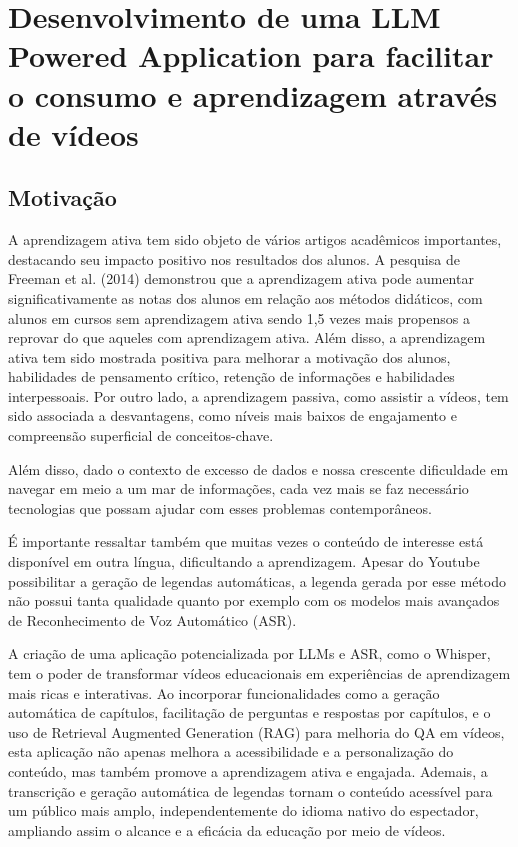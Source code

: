 \documentclass[tcc,capa]{texufpel}
\begin{document}
\chapter{Desenvolvimento de uma LLM Powered Application para facilitar o consumo e aprendizagem através de vídeos}

\section{Motivação}

A aprendizagem ativa tem sido objeto de vários artigos acadêmicos importantes, destacando seu impacto positivo nos resultados dos alunos. A pesquisa de Freeman et al. (2014) demonstrou que a aprendizagem ativa pode aumentar significativamente as notas dos alunos em relação aos métodos didáticos, com alunos em cursos sem aprendizagem ativa sendo 1,5 vezes mais propensos a reprovar do que aqueles com aprendizagem ativa. Além disso, a aprendizagem ativa tem sido mostrada positiva para melhorar a motivação dos alunos, habilidades de pensamento crítico, retenção de informações e habilidades interpessoais. Por outro lado, a aprendizagem passiva, como assistir a vídeos, tem sido associada a desvantagens, como níveis mais baixos de engajamento e compreensão superficial de conceitos-chave.

Além disso, dado o contexto de excesso de dados e nossa crescente dificuldade em navegar em meio a um mar de informações, cada vez mais se faz necessário tecnologias que possam ajudar com esses problemas contemporâneos.

É importante ressaltar também que muitas vezes o conteúdo de interesse está disponível em outra língua, dificultando a aprendizagem. Apesar do Youtube possibilitar a geração de legendas automáticas, a legenda gerada por esse método não possui tanta qualidade quanto por exemplo com os modelos mais avançados de Reconhecimento de Voz Automático (ASR).

A criação de uma aplicação potencializada por LLMs e ASR, como o Whisper, tem o poder de transformar vídeos educacionais em experiências de aprendizagem mais ricas e interativas. Ao incorporar funcionalidades como a geração automática de capítulos, facilitação de perguntas e respostas por capítulos, e o uso de Retrieval Augmented Generation (RAG) para melhoria do QA em vídeos, esta aplicação não apenas melhora a acessibilidade e a personalização do conteúdo, mas também promove a aprendizagem ativa e engajada. Ademais, a transcrição e geração automática de legendas tornam o conteúdo acessível para um público mais amplo, independentemente do idioma nativo do espectador, ampliando assim o alcance e a eficácia da educação por meio de vídeos.
\end{document}
